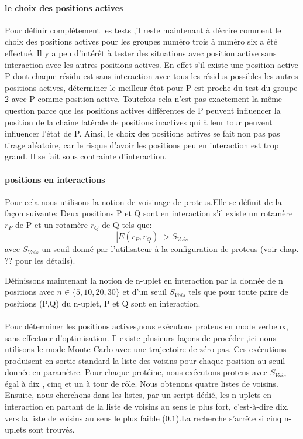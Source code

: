 \paragraph{le choix des positions actives}
\label{para:choix_posi}
Pour définir complètement les tests ,il reste maintenant à décrire comment le choix des positions actives pour les groupes numéro trois à numéro six a été effectué.
Il y a peu d'intérêt à tester des situations avec position active sans interaction avec les autres positions actives. 
En effet s'il existe une position active P dont chaque résidu est sans interaction avec tous les résidus possibles les autres positions actives, déterminer le meilleur état pour P est proche du test du groupe 2 avec P comme position active. Toutefois cela n'est pas exactement la même question parce que les positions actives différentes de P peuvent influencer la position de la chaîne latérale de positions inactives qui à leur tour peuvent influencer l'état de P.
Ainsi, le choix des positions actives se fait non pas pas tirage aléatoire, car le risque d'avoir les positions peu en interaction est trop grand. Il se fait sous contrainte d'interaction.

\paragraph{positions en interactions}
Pour cela nous utilisons la notion de voisinage de proteus.Elle se définit de la façon suivante:  
Deux positions P et Q sont en interaction s'il existe un rotamère $r_P$ de P et un rotamère $r_Q$ de Q tels que:
\begin{displaymath}
 | E(r_P,r_Q) | > S_{Vois}
\end{displaymath} 
avec $S_{Vois}$ un seuil donné par l'utilisateur à la configuration de proteus (voir chap. ?? pour les détails).

Définissons maintenant la notion de n-uplet en interaction par la donnée de n positions avec $n \in \{5,10,20,30\}$ et d'un seuil  $S_{Vois}$  tels que pour toute paire de positions (P,Q) du n-uplet, P et Q sont en interaction.
\paragraph{}
Pour déterminer les positions actives,nous exécutons proteus en mode verbeux, sans effectuer d'optimisation.
Il existe plusieurs façons de procéder ,ici nous utilisons le mode Monte-Carlo avec une trajectoire de zéro pas. Ces exécutions produisent en sortie standard la liste des voisins pour chaque position au seuil donnée en paramètre.
Pour chaque protéine, nous exécutons proteus avec  $S_{Vois}$ égal à dix , cinq et un à tour de rôle. Nous obtenons quatre listes de voisins. 
Ensuite, nous cherchons dans les listes, par un script dédié, les n-uplets en interaction en partant de la liste de voisins au sens le plus fort, c'est-à-dire dix, vers la liste de voisins au sens le plus faible ($0.1$).La recherche s'arrête si cinq n-uplets sont trouvés.

